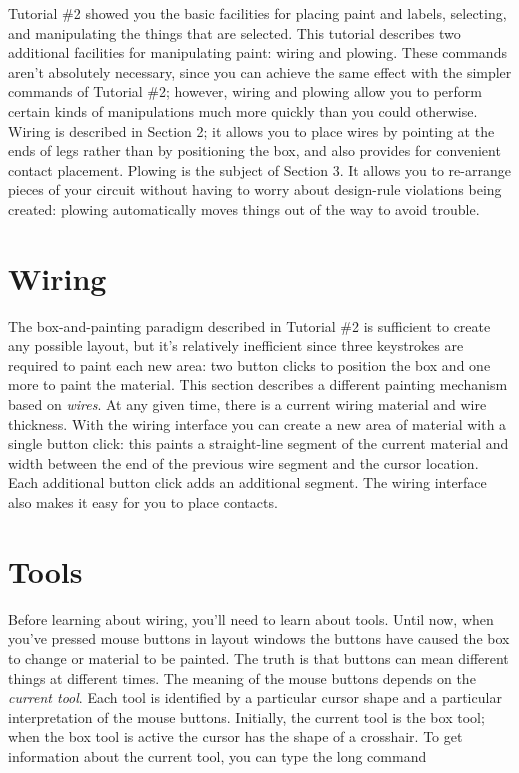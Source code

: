 \documentclass[letterpaper,twoside,12pt]{article}
\begin{document}
Tutorial \#2 showed you the basic facilities for placing paint and
labels, selecting, and manipulating the things that are
selected.  This tutorial describes two additional facilities for
manipulating paint:  wiring and plowing.  These commands aren't
absolutely necessary, since you can achieve the same effect with
the simpler commands of Tutorial \#2;  however, wiring and plowing
allow you to perform certain kinds of manipulations much more quickly
than you could otherwise.  Wiring is described in Section 2;  it
allows you to place wires by pointing at the ends of legs rather
than by positioning the box, and also provides for convenient contact
placement.  Plowing is the subject of Section 3.  It allows you to
re-arrange pieces of your circuit without having to worry about
design-rule violations being created:  plowing automatically moves
things out of the way to avoid trouble.

\section{Wiring}

The box-and-painting paradigm described in Tutorial \#2 is sufficient
to create any possible layout, but it's relatively inefficient
since three keystrokes are required to paint each new area:  two
button clicks to position the box and one more to paint the material.
This section describes a different painting mechanism based on
{\itshape wires}.  At any given time, there is a current wiring material
and wire thickness.  With the wiring interface you can create a new
area of material with a single button click:  this paints a straight-line
segment of the current material and width
between the end of the previous wire segment and the cursor location.
Each additional button click adds an additional segment.  The wiring
interface also makes it easy for you to place contacts.
\section{Tools}

Before learning about wiring, you'll need to learn about tools.
Until now, when you've pressed mouse buttons in layout windows the
buttons have caused the box to change or material to be painted.
The truth is that buttons can mean different things at different times.
The meaning of the mouse buttons depends on the {\itshape current tool}.
Each tool is identified by a particular cursor shape and a
particular interpretation of the mouse buttons.  Initially, the current
tool is the box tool;  when the box tool is active the cursor has
the shape of a crosshair.  To get information about the current tool,
you can type the long command
\end{document}
